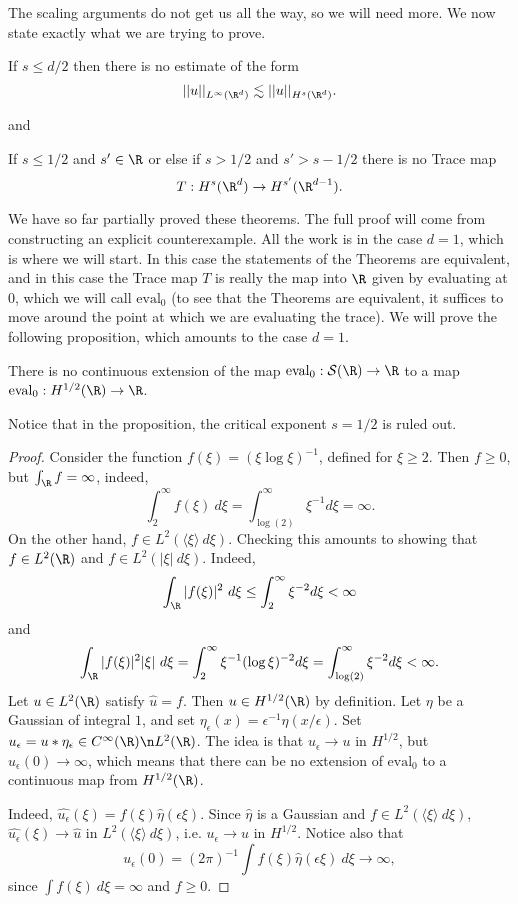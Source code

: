 \documentclass[12pt]{article}
\begin{document}
The scaling arguments do not get us all the way, so we will need more. We now state exactly what we are trying to prove.
\begin{thm}\label{embest}If $s \leq d/2$ then there is no estimate of the form \[||u||_{L^{\infty}(\R^d)} \lesssim ||u||_{H^s(\R^d)}.\]\end{thm}
and
\begin{thm}\label{restribest}If $s \leq 1/2$ and $s' \in \R$ or else if $s > 1/2$ and $s' > s-1/2$ there is no Trace map
\[T:H^s(\R^{d}) \to H^{s'}(\R^{d-1}).\]\end{thm}

We have so far partially proved these theorems. The full proof will come from constructing an explicit counterexample. All the work is in the case $d=1$, which is where we will start. In this case the statements of the Theorems are equivalent, and in this case the Trace map $T$ is really the map into $\R$ given by evaluating at $0$, which we will call $\text{eval}_0$ (to see that the Theorems are equivalent, it suffices to move around the point at which we are evaluating the trace). We will prove the following proposition, which amounts to the case $d=1$.
\begin{prop}\label{thebest}There is no continuous extension of the map $\text{eval}_0:\mathcal S(\R)  \to \R$ to a map $\text{eval}_0: H^{1/2}(\R) \to \R$.\end{prop}
Notice that in the proposition, the critical exponent $s=1/2$ is ruled out.
\begin{proof}Consider the function $f(\xi) = (\xi\log\xi)^{-1}$, defined for $\xi \geq 2$. Then $f \geq 0$, but $\int_{\R} f = \infty$, indeed,
\[\int_2^\infty f(\xi) \ d\xi = \int_{\log(2)}^\infty \xi^{-1} d\xi = \infty.\] On the other hand, $f \in L^2(\langle \xi \rangle\ d\xi)$. Checking this amounts to showing that $f \in L^2(\R)$ and $f \in L^2(|\xi|\ d\xi)$. Indeed,
\[\int_{\R} |f(\xi)|^2\ d\xi \leq \int_2^\infty \xi^{-2} d\xi < \infty\] and
\[\int_{\R} |f(\xi)|^2|\xi|\ d\xi = \int_2^\infty \xi^{-1}(\log \xi)^{-2} d\xi = \int_{\log(2)}^\infty \xi^{-2} d\xi < \infty.\]
Let $u \in L^2(\R)$ satisfy $\hat{u} = f$. Then $u \in H^{1/2}(\R)$ by definition. Let $\eta$ be a Gaussian of integral $1$, and set $\eta_\epsilon(x) = \epsilon^{-1}\eta(x/\epsilon)$. Set $u_\epsilon = u\ast\eta_\epsilon \in C^\infty(\R)\n L^2(\R)$. The idea is that $u_\epsilon \to u$ in $H^{1/2}$, but $u_\epsilon(0) \to \infty$, which means that there can be no extension of $\text{eval}_0$ to a continuous map from $H^{1/2}(\R)$.

Indeed, $\widehat{u_\epsilon}(\xi) = f(\xi)\hat{\eta}(\epsilon\xi)$. Since $\hat{\eta}$ is a Gaussian and $f \in L^2(\langle \xi \rangle\ d\xi)$, $\widehat{u_\epsilon}(\xi) \to \widehat{u}$ in $L^2(\langle \xi \rangle\ d\xi)$, i.e. $u_\epsilon \to u$ in $H^{1/2}$. Notice also that 
\[u_\epsilon(0) = (2\pi)^{-1}\int f(\xi)\hat{\eta}(\epsilon\xi)\ d\xi \to \infty,\]
since $\int f(\xi)\ d\xi = \infty$ and $f \geq 0$.\end{proof}
\end{document}

